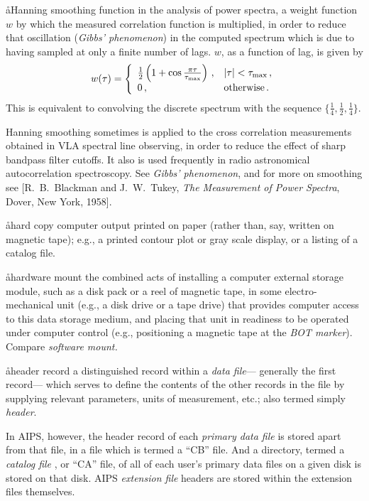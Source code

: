 \aa{Hanning smoothing function}
in the analysis of power spectra, a weight function $w$ by
which the measured correlation function is multiplied,
in order to reduce that oscillation ({\it Gibbs' phenomenon}\/)
in the computed spectrum which is due to having sampled at only a
finite number of lags.
$w$, as a function of lag, is given by
$$w(\tau)=\left\{ \begin{array}{ll}
{1\over2}\left( 1+\cos{\pi\tau\over\tau_{\operatorname{max}}} \right)\,,
&|\tau|<\tau_{\operatorname{max}}\,,\\0\,,&\text{otherwise}\,.
\end{array}\right.
$$
This is equivalent to convolving the discrete spectrum with the sequence
$\{\frac14,\frac12,\frac14\}$.
\par
Hanning smoothing sometimes is applied to the cross correlation
measurements obtained in VLA spectral line observing,
in order to reduce the effect of sharp bandpass filter cutoffs.
It also is used frequently in radio astronomical autocorrelation
spectroscopy.
See {\it Gibbs' phenomenon}, and for more on smoothing see
[R.~B.~Blackman and J.~W.~Tukey, {\it The Measurement of Power
Spectra}, Dover, New York, 1958].

\aa{hard copy}
computer output printed on paper (rather than, say, written on magnetic tape);
e.g., a printed contour plot or gray scale display,
or a listing of a catalog file.

\aa{hardware mount}
the combined acts of installing a computer external storage module,
such as a disk pack or a reel of magnetic tape,
in some electro-mechanical unit
(e.g., a disk drive or a tape drive) that provides computer access
to this data storage medium,
and placing that unit in readiness to be operated under
computer control (e.g., positioning a magnetic tape at
the {\it BOT marker}\/).
Compare {\it software mount.}

\aa{header record}
a distinguished record within a {\it data file}---%
generally the first record---%
which serves to define the contents of the other records in the file
by supplying relevant parameters, units of measurement, etc.;
also termed simply {\it header}.
\par
In AIPS, however, the header record of each {\it primary data file}
is stored apart from that file, in a file which is termed a ``CB'' file.
And a directory, termed a {\it catalog file} \qv, or ``CA'' file,
of all of each user's primary data files on a given disk is stored on
that disk.
AIPS {\it extension file} headers are stored within the extension
files themselves.

